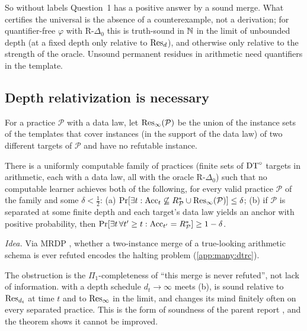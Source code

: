 So without labels Question~1 has a positive answer by a sound merge. What certifies the universal is the absence of a
counterexample, not a derivation; for quantifier-free $\varphi$ with R-$\Delta_0$ this is truth-sound in $\mathbb{N}$ in the limit
of unbounded depth (at a fixed depth only relative to $\mathrm{Res}_d$), and otherwise only relative to the strength of the
oracle. Unsound permanent residues in arithmetic need quantifiers in the template.

\subsection{Depth relativization is necessary}\label{sec:many:depth}

For a practice $\mathcal P$ with a data law, let $\mathrm{Res}_\infty(\mathcal P)$ be the union of the instance sets of the
templates that cover instances (in the support of the data law) of two different targets of $\mathcal P$ and have no
refutable instance.

\begin{theorem}\label{thm:many:depth}
There is a uniformly computable family of practices (finite sets of $\mathrm{DT}^{\circ}$ targets in arithmetic, each with a data law,
all with the oracle R-$\Delta_0$) such that no computable learner achieves both of the following, for every valid practice
$\mathcal P$ of the family and some $\delta<\frac12$:
(a) $\Pr[\exists t:\mathrm{Acc}_t\not\subseteq R^{*}_{\mathcal P}\cup\mathrm{Res}_\infty(\mathcal P)]\le\delta$;
(b) if $\mathcal P$ is separated at some finite depth and each target's data law yields an anchor with positive
probability, then $\Pr[\exists t\,\forall t'\ge t:\mathrm{Acc}_{t'}=R^{*}_{\mathcal P}]\ge1-\delta$.
\end{theorem}
\noindent\emph{Idea.} Via MRDP \citep{davis1961decision,matiyasevich1993hilbert}, whether a two-instance merge of a
true-looking arithmetic schema is ever refuted encodes the halting problem (\cref{app:many:dtrc}).\medskip

The obstruction is the $\Pi_1$-completeness of ``this merge is never refuted'', not lack of information. \DTRC{} with a
depth schedule $d_t\to\infty$ meets (b), is sound relative to $\mathrm{Res}_{d_t}$ at time $t$ and to $\mathrm{Res}_\infty$ in the limit,
and changes its mind finitely often on every separated practice. This is the form of soundness of the parent report
\citep{claude2026whatfollows}, and the theorem shows it cannot be improved.

